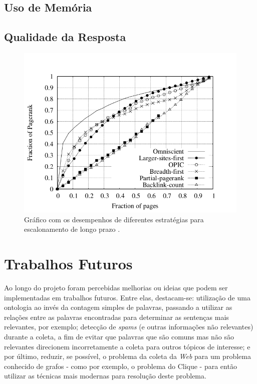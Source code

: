 \documentclass[a4paper,12pt,titlepage]{article}
\begin{document}
\subsection{Uso de Memória}

\subsection{Qualidade da Resposta}

\begin{figure}[H]
     \centering
     \includegraphics[scale=0.45]{figures/performance.png}
     \caption{Gráfico com os desempenhos de diferentes estratégias para escalonamento de longo prazo  \cite{carlos}.}
     \label{bsp}
\end{figure}


\section{Trabalhos Futuros}

Ao longo do projeto foram percebidas melhorias ou ideias que podem ser implementadas em trabalhos futuros. Entre elas, destacam-se: utilização de uma ontologia ao invés da contagem simples de palavras, passando a utilizar as relações entre as palavras encontradas para determinar as sentenças mais relevantes, por exemplo; detecção de \textit{spams} (e outras informações não relevantes) durante a coleta, a fim de evitar que palavras que são comuns mas não são relevantes direcionem incorretamente a coleta para outros tópicos de interesse; e por último, reduzir, se possível, o problema da coleta da \textit{Web} para um problema conhecido de grafos - como por exemplo, o problema do Clique - para então utilizar as técnicas mais modernas para resolução deste problema.
\end{document}
